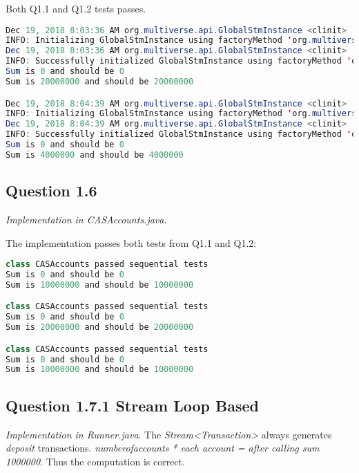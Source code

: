 \documentclass[format=acmsmall, review=false, screen=true]{acmart}
\begin{document}
Both Q1.1 and Q1.2 tests passes.

\begin{lstlisting}[language=java]
Dec 19, 2018 8:03:36 AM org.multiverse.api.GlobalStmInstance <clinit>
INFO: Initializing GlobalStmInstance using factoryMethod 'org.multiverse.stms.gamma.GammaStm.createFast'.
Dec 19, 2018 8:03:36 AM org.multiverse.api.GlobalStmInstance <clinit>
INFO: Successfully initialized GlobalStmInstance using factoryMethod 'org.multiverse.stms.gamma.GammaStm.createFast'.
Sum is 0 and should be 0
Sum is 20000000 and should be 20000000

Dec 19, 2018 8:04:39 AM org.multiverse.api.GlobalStmInstance <clinit>
INFO: Initializing GlobalStmInstance using factoryMethod 'org.multiverse.stms.gamma.GammaStm.createFast'.
Dec 19, 2018 8:04:39 AM org.multiverse.api.GlobalStmInstance <clinit>
INFO: Successfully initialized GlobalStmInstance using factoryMethod 'org.multiverse.stms.gamma.GammaStm.createFast'.
Sum is 0 and should be 0
Sum is 4000000 and should be 4000000
\end{lstlisting}

\subsection{Question 1.6}

\textit{Implementation in CASAccounts.java}.

The implementation passes both tests from Q1.1 and Q1.2:

\begin{lstlisting}[language=java]
class CASAccounts passed sequential tests
Sum is 0 and should be 0
Sum is 10000000 and should be 10000000

class CASAccounts passed sequential tests
Sum is 0 and should be 0
Sum is 20000000 and should be 20000000

class CASAccounts passed sequential tests
Sum is 0 and should be 0
Sum is 10000000 and should be 10000000
\end{lstlisting}

\subsection{Question 1.7.1 Stream Loop Based}

\textit{Implementation in Runner.java}. The \emph{Stream<Transaction>} always generates \emph{deposit} transactions. \emph{numberofaccounts * each account = after calling sum 1000000}. Thus the computation is correct.
\end{document}
